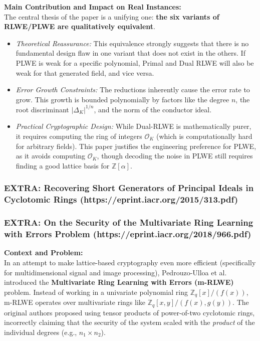 \textbf{Main Contribution and Impact on Real Instances:} \\
The central thesis of the paper is a unifying one: \textbf{the six variants of RLWE/PLWE are qualitatively equivalent}. 
\begin{itemize}
    \item \textit{Theoretical Reassurance:} This equivalence strongly suggests that there is no fundamental design flaw in one variant that does not exist in the others. If PLWE is weak for a specific polynomial, Primal and Dual RLWE will also be weak for that generated field, and vice versa.
    \item \textit{Error Growth Constraints:} The reductions inherently cause the error rate to grow. This growth is bounded polynomially by factors like the degree $n$, the root discriminant $|\Delta_K|^{1/n}$, and the norm of the conductor ideal.
    \item \textit{Practical Cryptographic Design:} While Dual-RLWE is mathematically purer, it requires computing the ring of integers $\mathcal{O}_K$ (which is computationally hard for arbitrary fields). This paper justifies the engineering preference for PLWE, as it avoids computing $\mathcal{O}_K$, though decoding the noise in PLWE still requires finding a good lattice basis for $\mathbb{Z}[\alpha]$.
\end{itemize}


\subsubsection{EXTRA: Recovering Short Generators of Principal Ideals in Cyclotomic Rings (https://eprint.iacr.org/2015/313.pdf)}




\subsubsection{EXTRA: On the Security of the Multivariate Ring Learning with Errors Problem (https://eprint.iacr.org/2018/966.pdf)}

\textbf{Context and Problem:} \\
In an attempt to make lattice-based cryptography even more efficient (specifically for multidimensional signal and image processing), Pedrouzo-Ulloa et al. introduced the \textbf{Multivariate Ring Learning with Errors (m-RLWE)} problem. Instead of working in a univariate polynomial ring $\mathbb{Z}_q[x]/(f(x))$, m-RLWE operates over multivariate rings like $\mathbb{Z}_q[x, y]/(f(x), g(y))$. The original authors proposed using tensor products of power-of-two cyclotomic rings, incorrectly claiming that the security of the system scaled with the \textit{product} of the individual degrees (e.g., $n_1 \times n_2$).

